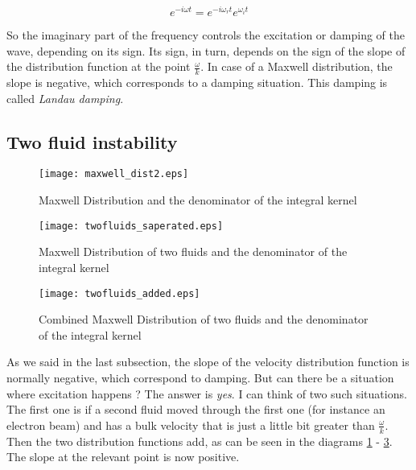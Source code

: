 \documentclass[a4paper,10pt]{report}
\begin{document}
\begin{equation}
    e^{-i \omega t}=e^{-i \omega_r t}e^{ \omega_i t}
\end{equation}

So the imaginary part of the frequency controls the excitation or damping of the wave, depending on its sign. Its sign, in turn, depends on the sign of the slope of the distribution function at the point $\frac{\omega}{k}$. In case of a Maxwell distribution, the slope is negative, which corresponds to a damping situation. This damping is called \emph{Landau damping}.

\subsection{Two fluid instability}

\begin{figure}
  \texttt{[image: maxwell\_dist2.eps]}\\
  \caption{Maxwell Distribution and the denominator of the integral kernel}\label{fig_maxwell2}
\end{figure}

\begin{figure}
  \texttt{[image: twofluids\_saperated.eps]}\\
  \caption{Maxwell Distribution of two fluids and the denominator of the integral kernel}\label{fig_2fluids_sep}
\end{figure}

\begin{figure}
  \texttt{[image: twofluids\_added.eps]}\\
  \caption{Combined Maxwell Distribution of two fluids and the denominator of the integral kernel}\label{fig_2fluids_added}
\end{figure}

As we said in the last subsection, the slope of the velocity distribution function is normally negative, which correspond to damping. But can there be a situation where excitation happens ? The answer is \emph{yes}. I can think of two such situations. The first one is if a second fluid moved through the first one (for instance an electron beam) and has a bulk velocity that is just a little bit greater than $\frac{\omega}{k}$. Then the two distribution functions add, as can be seen in the diagrams \ref{fig_maxwell2} - \ref{fig_2fluids_added}. The slope at the relevant point is now positive.
\end{document}
